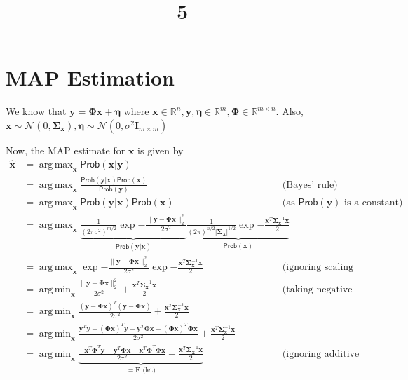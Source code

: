 \documentclass[a4paper]{article}
\title{5}
\date{}
\DeclareMathOperator*{\argmax}{arg\,max}
\DeclareMathOperator*{\argmin}{arg\,min}
\renewcommand{\P}{\textsf{Prob}}
\begin{document}
\maketitle
\section{MAP Estimation}
We know that $\bm{y}=\bm{\Phi}\bm{x}+\bm{\eta}$ where $\bm{x}\in\mathbb{R}^n,\bm{y},\bm{\eta}\in\mathbb{R}^m, \bm{\Phi}\in\mathbb{R}^{m\times n}$. Also, $\bm{x}\sim \mathcal{N}(0,\bm{\Sigma}_{\bm{x}}), \bm{\eta}\sim \mathcal{N}(0,\sigma^2\bm{I}_{m\times m})$

Now, the MAP estimate for $\bm{x}$ is given by
\begin{align*}
\bm{\hat{x}}
&= \argmax_{\bm{x}} \P(\bm{x} | \bm{y})\\
&= \argmax_{\bm{x}} \frac{\P(\bm{y} | \bm{x}) \P(\bm{x})}{\P(\bm{y})} & \text{(Bayes' rule)}\\
&= \argmax_{\bm{x}} \P(\bm{y} | \bm{x}) \P(\bm{x}) & \text{(as $\P(\bm{y})$ is a constant)}\\
&= \argmax_{\bm{x}} \underbrace{\frac{1}{(2\pi\sigma^2)^{m/2}}\exp{-\frac{\|\bm{y}-\bm{\Phi}\bm{x}\|_2^2}{2\sigma^2}}}_{\P(\bm{y} | \bm{x})} \underbrace{\frac{1}{(2\pi)^{n/2}|\bm{\Sigma}_{\bm{x}}|^{1/2}}\exp{-\frac{\bm{x}^T\bm{\Sigma}_{\bm{x}}^{-1}\bm{x}}{2}}}_{\P(\bm{x})}\\
&= \argmax_{\bm{x}} \exp{-\frac{\|\bm{y}-\bm{\Phi}\bm{x}\|_2^2}{2\sigma^2}} \exp{-\frac{\bm{x}^T\bm{\Sigma}_{\bm{x}}^{-1}\bm{x}}{2}} & \text{(ignoring scaling constants)}\\
&= \argmin_{\bm{x}} \frac{\|\bm{y}-\bm{\Phi}\bm{x}\|_2^2}{2\sigma^2} + \frac{\bm{x}^T\bm{\Sigma}_{\bm{x}}^{-1}\bm{x}}{2} & \text{(taking negative logarithm)}\\
&= \argmin_{\bm{x}} \frac{(\bm{y}-\bm{\Phi}\bm{x})^T(\bm{y}-\bm{\Phi}\bm{x})}{2\sigma^2} + \frac{\bm{x}^T\bm{\Sigma}_{\bm{x}}^{-1}\bm{x}}{2}\\
&= \argmin_{\bm{x}} \frac{\bm{y}^T\bm{y}-(\bm{\Phi}\bm{x})^T\bm{y}-\bm{y}^T\bm{\Phi}\bm{x}+(\bm{\Phi}\bm{x})^T\bm{\Phi}\bm{x}}{2\sigma^2} + \frac{\bm{x}^T\bm{\Sigma}_{\bm{x}}^{-1}\bm{x}}{2}\\
&= \argmin_{\bm{x}} \underbrace{\frac{-\bm{x}^T\bm{\Phi}^T\bm{y}-\bm{y}^T\bm{\Phi}\bm{x}+\bm{x}^T\bm{\Phi}^T\bm{\Phi}\bm{x}}{2\sigma^2} + \frac{\bm{x}^T\bm{\Sigma}_{\bm{x}}^{-1}\bm{x}}{2}}_{=\bm{F} \text{ (let)}} & \text{(ignoring additive constants)}\\
\end{align*}
\end{document}
